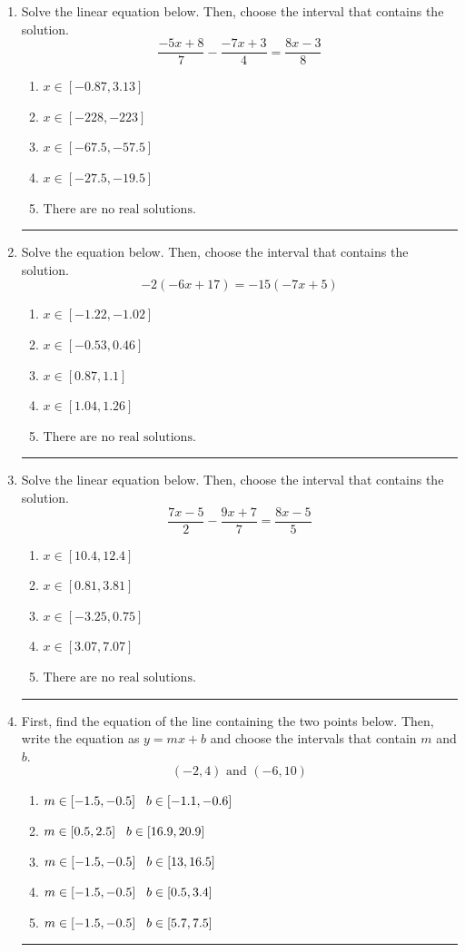 \documentclass[14pt]{extbook}
\newcommand{\litem}[1]{\item#1\hspace*{-1cm}\rule{\textwidth}{0.4pt}}
\begin{document}
\begin{enumerate}
{\begin{enumerate}[label=\Alph*.]
\end{enumerate} }
\litem{
Solve the linear equation below. Then, choose the interval that contains the solution.\[ \frac{-5x + 8}{7} - \frac{-7x + 3}{4} = \frac{8x -3}{8} \]\begin{enumerate}[label=\Alph*.]
\item \( x \in [-0.87, 3.13] \)
\item \( x \in [-228, -223] \)
\item \( x \in [-67.5, -57.5] \)
\item \( x \in [-27.5, -19.5] \)
\item \( \text{There are no real solutions.} \)

\end{enumerate} }
\litem{
Solve the equation below. Then, choose the interval that contains the solution.\[ -2(-6x + 17) = -15(-7x + 5) \]\begin{enumerate}[label=\Alph*.]
\item \( x \in [-1.22, -1.02] \)
\item \( x \in [-0.53, 0.46] \)
\item \( x \in [0.87, 1.1] \)
\item \( x \in [1.04, 1.26] \)
\item \( \text{There are no real solutions.} \)

\end{enumerate} }
\litem{
Solve the linear equation below. Then, choose the interval that contains the solution.\[ \frac{7x -5}{2} - \frac{9x + 7}{7} = \frac{8x -5}{5} \]\begin{enumerate}[label=\Alph*.]
\item \( x \in [10.4, 12.4] \)
\item \( x \in [0.81, 3.81] \)
\item \( x \in [-3.25, 0.75] \)
\item \( x \in [3.07, 7.07] \)
\item \( \text{There are no real solutions.} \)

\end{enumerate} }
\litem{
First, find the equation of the line containing the two points below. Then, write the equation as $ y=mx+b $ and choose the intervals that contain $m$ and $b$.\[ (-2, 4) \text{ and } (-6, 10) \]\begin{enumerate}[label=\Alph*.]
\item \( m \in [-1.5, -0.5] \hspace*{3mm} b \in [-1.1, -0.6] \)
\item \( m \in [0.5, 2.5] \hspace*{3mm} b \in [16.9, 20.9] \)
\item \( m \in [-1.5, -0.5] \hspace*{3mm} b \in [13, 16.5] \)
\item \( m \in [-1.5, -0.5] \hspace*{3mm} b \in [0.5, 3.4] \)
\item \( m \in [-1.5, -0.5] \hspace*{3mm} b \in [5.7, 7.5] \)

\end{enumerate} }
\end{enumerate}
\end{document}
